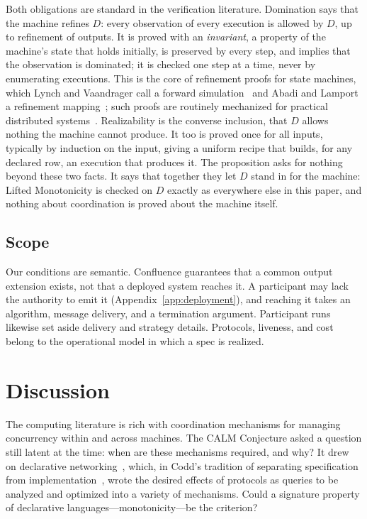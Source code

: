 \documentclass[sigconf]{cidr-2027}
\theoremstyle{remark}
\newcommand{\outnoun}{output extension\xspace}%
\begin{document}
Both obligations are standard in the verification literature.  Domination
says that the machine refines $D$: every observation of every execution is
allowed by $D$, up to refinement of outputs.  It is proved with an
\emph{invariant}, a property of the machine's state that holds initially, is
preserved by every step, and implies that the observation is dominated; it is
checked one step at a time, never by enumerating executions.  This is the core
of refinement proofs for state machines, which Lynch and Vaandrager call a
forward simulation~\cite{lynch1995forward} and Abadi and Lamport a refinement
mapping~\cite{abadi1991refinement}; such proofs are routinely mechanized for
practical distributed systems~\cite{hawblitzel2015ironfleet}.  Realizability
is the converse inclusion, that $D$ allows nothing the machine cannot produce.
It too is proved once for all inputs, typically by induction on the input,
giving a uniform recipe that builds, for any declared row, an execution that
produces it.  The proposition asks for nothing beyond these two facts.  It
says that together they let $D$ stand in for the machine: Lifted Monotonicity
is checked on $D$ exactly as everywhere else in this paper, and nothing about
coordination is proved about the machine itself.

\subsection{Scope}
\label{sec:scope}

Our conditions are semantic.  Confluence guarantees that a common \outnoun
exists, not that a deployed system reaches it.  A participant may lack the
authority to emit it (Appendix~\ref{app:deployment}), and reaching it takes an
algorithm, message delivery, and a termination argument.  Participant runs
likewise set aside delivery and strategy details.  Protocols,
liveness, and cost belong to the operational model in which a spec is
realized.


\section{Discussion}
\label{sec:discussion}

The computing literature is rich with coordination mechanisms for managing
concurrency within and across machines. The CALM Conjecture asked a question
still latent at the time: when are these mechanisms required, and why? It drew
on declarative networking~\cite{loo2009declarative}, which, in Codd's tradition
of separating specification from implementation~\cite{codd1970relational}, wrote
the desired effects of protocols as queries to be analyzed and optimized into a
variety of mechanisms. Could a signature property of declarative
languages---monotonicity---be the criterion?
\end{document}
